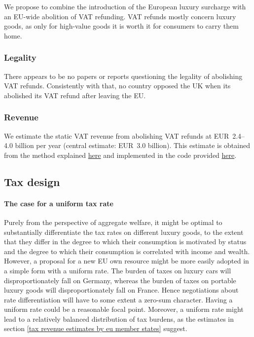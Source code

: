 \documentclass[../../main]{subfiles}
\begin{document}
We propose to combine the introduction of the European luxury surcharge with an EU-wide abolition of VAT refunding. VAT refunds mostly concern luxury goods, as only for high-value goods it is worth it for consumers to carry them home. 

\subsubsection{Legality}
There appears to be no papers or reports questioning the legality of abolishing VAT refunds. Consistently with that, no country opposed the UK when its abolished its VAT refund after leaving the EU.

\subsubsection{Revenue}
We estimate the static VAT revenue from abolishing VAT refunds at EUR~2.4--4.0 billion per year (central estimate: EUR~3.0 billion). This estimate is obtained from the method explained \href{https://github.com/Montagnard/rapport-GRA-ft.-GC/blob/main/annexes/luxury/methodology/vat_return_abolition_data_method.txt}{here} and implemented in the code provided \href{https://github.com/Montagnard/rapport-GRA-ft.-GC/blob/main/annexes/luxury/methodology/vat_return_abolition_data.py}{here}.





\subsection{Tax design}

\paragraph{The case for a uniform tax rate}

Purely from the perspective of aggregate welfare, it might be optimal to substantially differentiate the tax rates on different luxury goods, to the extent that they differ in the degree to which their consumption is motivated by status and the degree to which their consumption is correlated with income and wealth. However, a proposal for %
a new EU own resource might be more easily adopted in a simple form with a uniform rate. The burden of taxes on luxury cars will disproportionately fall on Germany, whereas the burden of taxes on portable luxury goods will disproportionately fall on France. Hence negotiations about rate differentiation will have to some extent a zero-sum character. Having a uniform rate could be a reasonable focal point. Moreover, a uniform rate might lead to a relatively balanced distribution of tax burdens, as the estimates in section \ref{tax revenue estimates by eu member states} suggest.
\end{document}

